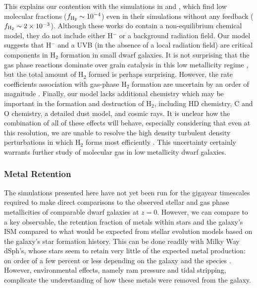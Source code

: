 \documentclass[twocolumn]{aastex61}
\begin{document}
This explains our contention with the simulations in \citet{Hu2016} and \citet{Hu2017}, which find low molecular fractions ($f_{\rm H_2} \sim 10^{-4}$) even in their simulations without any feedback ($f_{\rm H_2} \sim 2 \times 10^{-3}$). Although these works do contain a non-equilibrium chemical model, they do not include either H$^{-}$ or a background radiation field. Our model suggests that H$^{-}$ and a UVB (in the absence of a local radiation field) are critical components in H$_2$ formation in small dwarf galaxies. It is not surprising that the gas phase reactions dominate over grain catalysis in this low metallicity regime \citep{Glover2003}, but the total amount of H$_2$ formed is perhaps surprising. However, the rate coefficients association with gas-phase H$_2$ formation are uncertain by an order of magnitude \citep{Glover2006,Glover2007}.
Finally, our model lacks additional chemistry which may be important in the formation and destruction of H$_2$, including HD chemistry, C and O chemistry, a detailed dust model, and cosmic rays. It is unclear how the combination of all of these effects will behave, especially considering that even at this resolution, we are unable to resolve the high density turbulent density perturbations in which H$_2$ forms most efficiently \citep{Glover2007}. This uncertainty certainly warrants further study of molecular gas in low metallicity dwarf galaxies.

\subsubsection{Metal Retention}
\label{sec:obs_metals}

The simulations presented here have not yet been run for the gigayear timescales required to make direct comparisons to the observed stellar and gas phase metallicities of comparable dwarf galaxies at $z = 0$. However, we can compare to a key observable, the retention fraction of metals within stars and the galaxy's ISM compared to what would be expected from stellar evolution models based on the galaxy's star formation history. This can be done readily with Milky Way dSph's, whose stars seem to retain very little of the expected metal production: on order of a few percent or less depending on the galaxy and the species \citep{Kirby2011-metals}. However, environmental effects, namely ram pressure and tidal stripping, complicate the understanding of how these metals were removed from the galaxy. 
\end{document}
